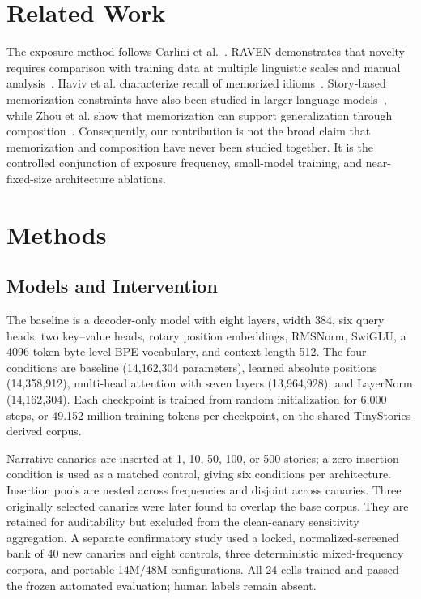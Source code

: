 \documentclass[conference]{IEEEtran}
\begin{document}
\section{Related Work}
The exposure method follows Carlini et al.~\cite{carlini2019secret}. RAVEN demonstrates that novelty requires
comparison with training data at multiple linguistic scales and manual analysis~\cite{mccoy2023raven}. Haviv
et al. characterize recall of memorized idioms~\cite{haviv2023idioms}. Story-based memorization constraints have
also been studied in larger language models~\cite{jiang2026stories}, while Zhou et al. show that memorization can
support generalization through composition~\cite{zhou2026longtail}. Consequently, our contribution is not the
broad claim that memorization and composition have never been studied together. It is the controlled conjunction
of exposure frequency, small-model training, and near-fixed-size architecture ablations.

\section{Methods}
\subsection{Models and Intervention}
The baseline is a decoder-only model with eight layers, width 384, six query heads, two key--value heads, rotary
position embeddings, RMSNorm, SwiGLU, a 4096-token byte-level BPE vocabulary, and context length 512. The four
conditions are baseline (14,162,304 parameters), learned absolute positions (14,358,912), multi-head attention
with seven layers (13,964,928), and LayerNorm (14,162,304). Each checkpoint is trained from random initialization
for 6,000 steps, or 49.152 million training tokens per checkpoint, on the shared TinyStories-derived corpus.

Narrative canaries are inserted at 1, 10, 50, 100, or 500 stories; a zero-insertion condition is used as a matched
control, giving six conditions per architecture. Insertion pools are nested across frequencies and disjoint across canaries. Three originally selected
canaries were later found to overlap the base corpus. They are retained for auditability but excluded from the
clean-canary sensitivity aggregation. A separate confirmatory study used a locked, normalized-screened bank of
40 new canaries and eight controls, three deterministic mixed-frequency corpora, and portable 14M/48M
configurations. All 24 cells trained and passed the frozen automated evaluation; human labels remain absent.
\end{document}
